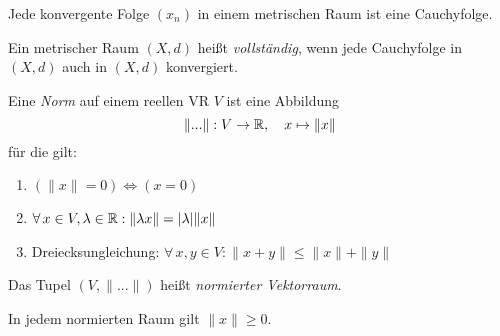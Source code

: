 \documentclass{cheat-sheet}
\begin{document}
\begin{satz}
Jede konvergente Folge $(x_n)$ in einem metrischen Raum ist eine Cauchyfolge.
\end{satz}

\begin{defn}
Ein metrischer Raum $(X, d)$ heißt \emph{vollständig}, wenn jede Cauchyfolge in $(X, d)$ auch in $(X, d)$ konvergiert.
\end{defn}


\begin{defn}
Eine \emph{Norm} auf einem reellen VR $V$ ist eine Abbildung
\[ \|...\| : V \to \mathbb{R},\quad x \mapsto \| x \| \]
für die gilt:
\begin{enumerate}
  \item $(\| x \| = 0) \iff (x = 0)$
  \item $\forall\,x \in V, \lambda \in \mathbb{R} : \| \lambda x \| = |\lambda| \| x \|$
  \item Dreiecksungleichung: $\forall\,x, y \in V : \| x + y \| \le \| x \| + \| y \|$
\end{enumerate}
Das Tupel $(V, \|...\|)$ heißt \emph{normierter Vektorraum}.
\end{defn}

\begin{bem}
In jedem normierten Raum gilt $\| x \| \ge 0$.
\end{bem}
\end{document}
